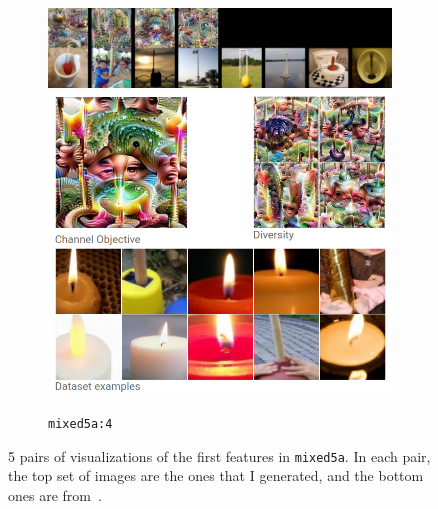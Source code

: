 \documentclass[12pt]{article}
\begin{document}
\begin{figure}[t]\ContinuedFloat
  \centering
  \vspace{-1.5em}

  \begin{subfigure}{\linewidth}
    \centering
    \includegraphics[width=\linewidth]{fig/mixed5a_4.png}
    \includegraphics[width=0.4\linewidth]{fig/olah_mixed5a_4.png}
    \caption{\texttt{mixed5a:4}}
  \end{subfigure}

  \caption{5 pairs of visualizations of the first features in \texttt{mixed5a}. In each pair, the top set of images are the ones that I generated, and the bottom ones are from~\cite{olah2017feature}.}
  \label{fig:comp_viz}
\end{figure}
\end{document}
